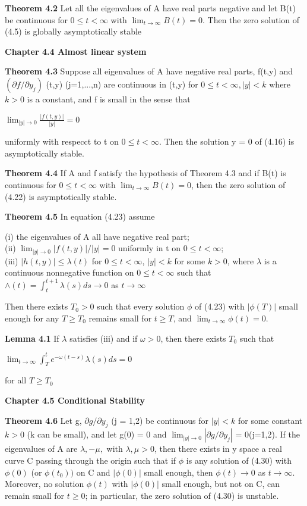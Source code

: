 \documentclass{article}
\begin{document}
\textbf {Theorem 4.2} Let all the eigenvalues of A have real parts negative and let B(t) be continuous for $0 \leq t < \infty$ with $\lim_{t \to \infty} B(t) = 0$. Then the zero solution of (4.5) is globally asymptotically stable

\textbf {Chapter 4.4 Almost linear system}

\textbf {Theorem 4.3} Suppose all eigenvalues of A have negative real parts, f(t,y) and $( \partial f / \partial y_j)$ (t,y) (j=1,...,n) are continuous in (t,y) for $0 \leq t < \infty, |y| < k$ where $k > 0$ is a constant, and f is small in the sense that
\begin{center}
$\lim_{|y| \to 0} \frac{|f(t,y)|}{|y|} = 0$
\end{center}
uniformly with respecct to t on $0 \leq t < \infty$. Then the solution y = 0 of (4.16) is asymptotically stable.

\textbf {Theorem 4.4} If A and f satisfy the hypothesis of Theorem 4.3 and if B(t) is continuous for $0 \leq t < \infty$ with $\lim_{t \to \infty} B(t) = 0$, then the zero solution of (4.22) is asymptotically stable.

\textbf {Theorem 4.5} In equation (4.23) assume
\begin{center}
(i) the eigenvalues of A all have negative real part; \\
(ii) $\lim_{|y| \to 0} |f(t,y)|/|y| = 0$ uniformly in t on $0 \leq t < \infty$; \\
(iii) $|h(t,y)| \leq \lambda(t)$ for $0 \leq t < \infty$, $|y| < k$ for some $k > 0$, where $\lambda$ is a continuous nonnegative function on $0 \leq t < \infty$ such that $\land(t) = \int_t^{t+1} \lambda(s) ds \to 0$ as $t \to \infty$
\end{center}
Then there exists $T_0 > 0$ such that every solution $\phi$ of (4.23) with $|\phi(T)|$ small enough for any $T \geq T_0$ remains small for $t \geq T$, and $\lim_{t \to \infty} \phi(t) = 0$.

\textbf {Lemma 4.1} If $\lambda$ satisfies (iii) and if $\omega > 0$, then there exists $T_0$ such that
\begin{center}
$\lim_{t \to \infty} \int_T^t e^{-\omega(t-s)} \lambda(s) ds= 0$
\end{center}
for all $T \geq T_0$

\textbf {Chapter 4.5 Conditional Stability}

\textbf {Theorem 4.6} Let g, $\partial g / \partial y_j$ (j = 1,2) be continuous for $|y| < k$ for some constant $k > 0$ (k can be small), and let g(0) = 0 and $\lim_{|y| \to 0} |\partial g / \partial y_j|$ = 0(j=1,2). If the eigenvalues of A are $\lambda , - \mu,$ with $\lambda , \mu > 0$, then there exists in y space a real curve C passing through the origin such that if $\phi$ is any solution of (4.30) with $\phi(0)$ (or $\phi(t_0))$ on C and $|\phi(0)|$ small enough, then $\phi(t) \to 0$ as $t \to \infty$. Moreover, no solution $\phi(t)$ with $|\phi(0)|$ small enough, but not on C, can remain small for $t \geq 0$; in particular, the zero solution of (4.30) is unstable.
\end{document}
